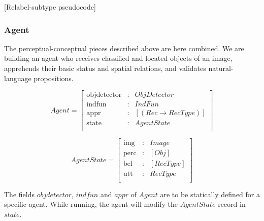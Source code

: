 \documentclass[11pt, a4paper]{article}
\begin{document}
[Relabel-subtype pseudocode]



\subsubsection{Agent}

The perceptual-conceptual pieces described above are here combined.
We are building an agent who receives classified and located objects of an image, apprehends their basic status and spatial relations, and validates natural-language propositions.

\begin{equation}\label{eq:agent}
Agent = \left[\begin{array}{rcl}
    \text{objdetector} &:& ObjDetector \\
    \text{indfun} &:& IndFun \\
    \text{appr} &:& [(Rec \rightarrow RecType)] \\
    \text{state} &:& AgentState \\
    \end{array}\right]
\end{equation}

\begin{equation}\label{eq:state}
AgentState = \left[\begin{array}{rcl}
    \text{img} &:& Image \\
    \text{perc} &:& [Obj] \\
    \text{bel} &:& [RecType] \\
    \text{utt} &:& RecType \\
    \end{array}\right]
\end{equation}

The fields $objdetector$, $indfun$ and $appr$ of $Agent$ are to be statically defined for a specific agent.
While running, the agent will modify the $AgentState$ record in $state$.
\end{document}
